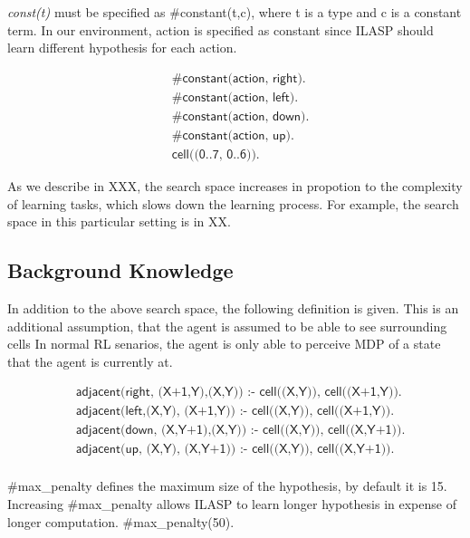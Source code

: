 \textit{const(t)} must be specified as \#constant(t,c), where t is a type and c is a constant term.
In our environment, action is specified as constant since ILASP should learn different hypothesis for each action.

\begin{equation}
\begin{split}
&\textsf{\#constant(action, right).}\\
&\textsf{\#constant(action, left).}\\
&\textsf{\#constant(action, down).}\\
&\textsf{\#constant(action, up).}\\
&\textsf{cell((0..7, 0..6)).}
\end{split}
\end{equation}

As we describe in XXX, the search space increases in propotion to the complexity of learning tasks, which slows down the learning process.
For example, the search space in this particular setting is in XX.

\subsection{Background Knowledge}

In addition to the above search space, the following definition is given. This is an additional assumption, 
that the agent is assumed to be able to see surrounding cells 
In normal RL senarios, the agent is only able to perceive MDP of a state that the agent is currently at. 

\begin{equation}
\begin{split}
&\textsf{adjacent(right, (X+1,Y),(X,Y)) :- cell((X,Y)), cell((X+1,Y)).} \\
&\textsf{adjacent(left,(X,Y),  (X+1,Y)) :- cell((X,Y)), cell((X+1,Y)).} \\
&\textsf{adjacent(down, (X,Y+1),(X,Y)) :- cell((X,Y)), cell((X,Y+1)).} \\
&\textsf{adjacent(up,   (X,Y),  (X,Y+1)) :- cell((X,Y)), cell((X,Y+1)).} \\
\end{split}
\end{equation}



\#max\_penalty defines the maximum size of the hypothesis, by default it is 15.
Increasing \#max\_penalty allows ILASP to learn longer hypothesis in expense of longer computation.
\#max\_penalty(50).

